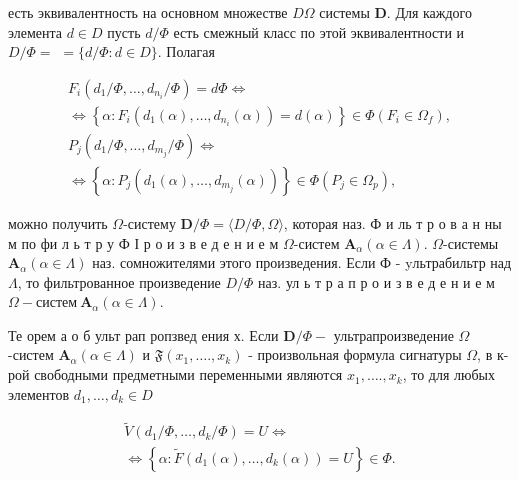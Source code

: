 \documentclass[10pt]{article}
\begin{document}
есть эквивалентность на основном множестве $D \Omega$ системы $\boldsymbol{D}$. Для каждого элемента $d \in D$ пусть $d / \Phi$ есть смежный класс по этой эквивалентности и $D / \Phi=$ $=\{d / \Phi: d \in D\}$. Полагая



\[

\begin{gathered}

F_{i}\left(d_{1} / \Phi, \ldots, d_{n_{i}} / \Phi\right)=d \Phi \Longleftrightarrow \\

\Longleftrightarrow\left\{\alpha: F_{i}\left(d_{1}(\alpha), \ldots, d_{n_{i}}(\alpha)\right)=d(\alpha)\right\} \in \Phi\left(F_{i} \in \Omega_{f}\right), \\

P_{j}\left(d_{1} / \Phi, \ldots, d_{m_{j}} / \Phi\right) \Longleftrightarrow \\

\Longleftrightarrow\left\{\alpha: P_{j}\left(d_{1}(\alpha), \ldots, d_{m_{j}}(\alpha)\right)\right\} \in \Phi\left(P_{j} \in \Omega_{p}\right),

\end{gathered}

\]



можно получить $\Omega$-систему $\boldsymbol{D} / \Phi=\langle D / \Phi, \Omega\rangle$, которая наз. Ф и ль т р о в а н ны м по фи л ь т р у Ф І р о и з в е д е н и е м $\Omega$-систем $\boldsymbol{A}_{\alpha}(\alpha \in \Lambda)$. $\Omega$-системы $\boldsymbol{A}_{\alpha}(\alpha \in \Lambda)$ наз. сомножителями этого произведения. Если Ф - yльтрабильтр над $\Lambda$, то фильтрованное произведение $D / \Phi$ наз. ул ь т р а п р о и з в е д е н и е м $\Omega-с и с т е м ~ \boldsymbol{A}_{\alpha}(\alpha \in \Lambda)$.



Те орем а о б ульт рап ропзвед ения х. Если $\boldsymbol{D} / \Phi-$ ультрапроизведение $\Omega$-систем $\boldsymbol{A}_{\alpha}(\alpha \in \Lambda)$ и $\mathfrak{F}\left(x_{1}, \ldots ., x_{k}\right)$ - произвольная формула сигнатуры $\Omega$, в к-рой свободными предметными переменными являются $x_{1}, \ldots ., x_{k}$, то для любых элементов $d_{1}, \ldots, d_{k} \in D$



\[

\begin{gathered}

\widetilde{V}\left(d_{1} / \Phi, \ldots, d_{k} / \Phi\right)=U \Longleftrightarrow \\

\Longleftrightarrow\left\{\alpha: \widetilde{F}\left(d_{1}(\alpha), \ldots, d_{k}(\alpha)\right)=U\right\} \in \Phi .

\end{gathered}

\]
\end{document}
